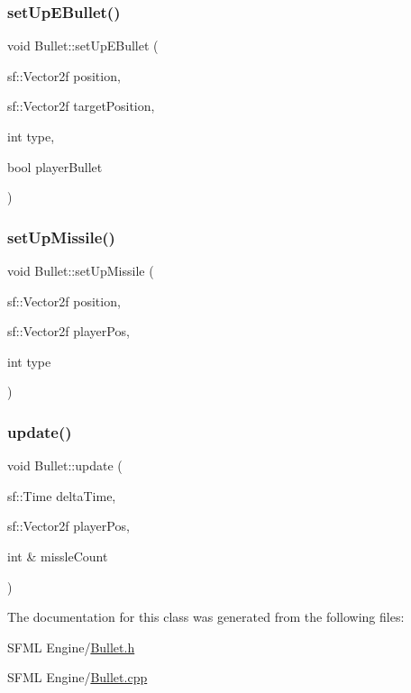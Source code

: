 \mbox{\label{class_bullet_afa7788ce043c909b96c37a0265755000}} 
\subsubsection{\texorpdfstring{set\+Up\+E\+Bullet()}{setUpEBullet()}}
{\footnotesize\ttfamily void Bullet\+::set\+Up\+E\+Bullet (\begin{DoxyParamCaption}\item[{sf\+::\+Vector2f}]{position,  }\item[{sf\+::\+Vector2f}]{target\+Position,  }\item[{int}]{type,  }\item[{bool}]{player\+Bullet }\end{DoxyParamCaption})}

\mbox{\label{class_bullet_a5ee57e44e79f829920f4c117937d5f97}} 
\subsubsection{\texorpdfstring{set\+Up\+Missile()}{setUpMissile()}}
{\footnotesize\ttfamily void Bullet\+::set\+Up\+Missile (\begin{DoxyParamCaption}\item[{sf\+::\+Vector2f}]{position,  }\item[{sf\+::\+Vector2f}]{player\+Pos,  }\item[{int}]{type }\end{DoxyParamCaption})}

\mbox{\label{class_bullet_ac1793d563983d2503cc562e0b3e1eee7}} 
\subsubsection{\texorpdfstring{update()}{update()}}
{\footnotesize\ttfamily void Bullet\+::update (\begin{DoxyParamCaption}\item[{sf\+::\+Time}]{delta\+Time,  }\item[{sf\+::\+Vector2f}]{player\+Pos,  }\item[{int \&}]{missle\+Count }\end{DoxyParamCaption})}



The documentation for this class was generated from the following files\+:\begin{DoxyCompactItemize}
\item 
S\+F\+M\+L Engine/\hyperlink{_bullet_8h}{Bullet.\+h}\item 
S\+F\+M\+L Engine/\hyperlink{_bullet_8cpp}{Bullet.\+cpp}\end{DoxyCompactItemize}
